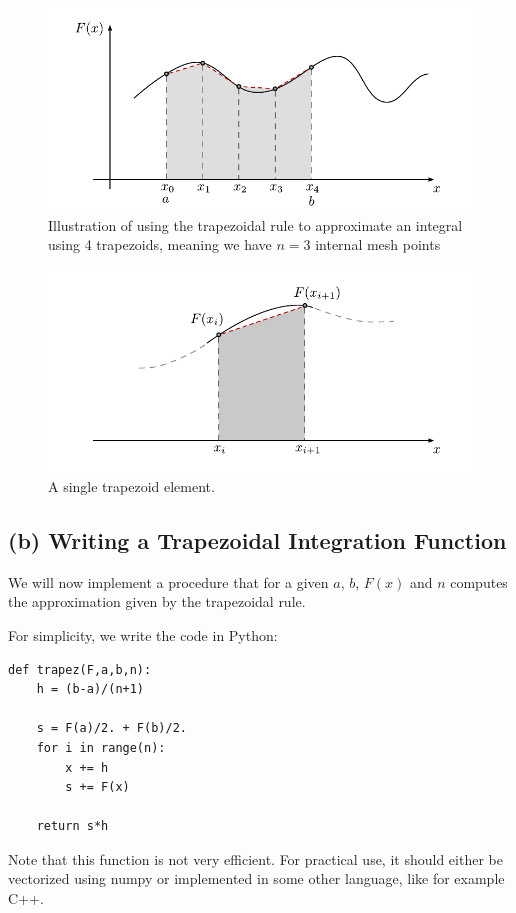 \documentclass[a4paper, 11pt, notitlepage, english]{article}
\begin{document}
\begin{figure}[p]
    \centering
    \includegraphics[width=\textwidth]{trapezoid}
    \caption{Illustration of using the trapezoidal rule to approximate an integral using 4 trapezoids, meaning we have $n=3$ internal mesh points \label{fig:trap}}
\end{figure}
\begin{figure}[p]
    \centering
    \includegraphics[width=\textwidth]{singleelement}
    \caption{A single trapezoid element. \label{fig:trap_se}}
\end{figure}

\clearpage

\subsection*{(b) Writing a Trapezoidal Integration Function}
We will now implement a procedure that for a given $a$, $b$, $F(x)$ and $n$ computes the approximation given by the trapezoidal rule. 

For simplicity, we write the code in Python:

\begin{lstlisting}
def trapez(F,a,b,n):
    h = (b-a)/(n+1)

    s = F(a)/2. + F(b)/2.
    for i in range(n):
        x += h
        s += F(x)
    
    return s*h
\end{lstlisting}
Note that this function is not very efficient. For practical use, it should either be vectorized using numpy or implemented in some other language, like for example C++.
\end{document}

